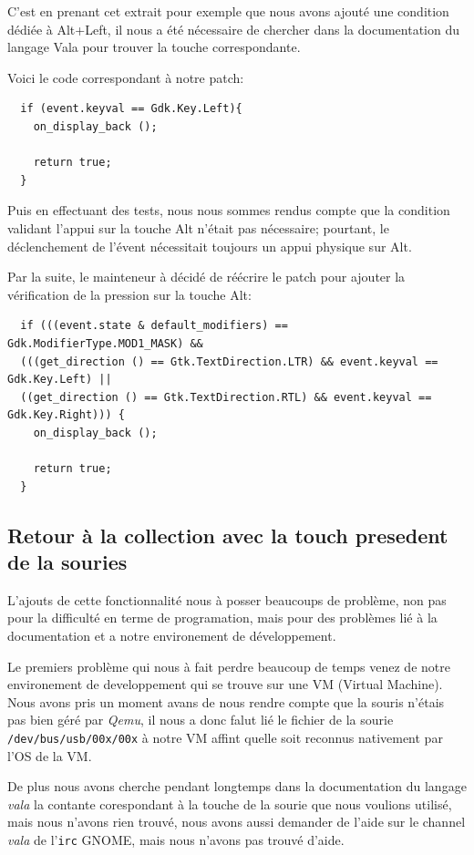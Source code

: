 \documentclass[12pt]{report}
\begin{document}
C'est en prenant cet extrait pour exemple que nous avons ajouté une
condition dédiée à Alt+Left, il nous a été nécessaire de chercher dans
la documentation du langage Vala pour trouver la touche
correspondante.

Voici le code correspondant à notre patch:

\begin{verbatim}
  if (event.keyval == Gdk.Key.Left){			
    on_display_back ();
    
    return true;
  }
\end{verbatim}

Puis en effectuant des tests, nous nous sommes rendus compte que la
condition validant l'appui sur la touche Alt n'était pas nécessaire;
pourtant, le déclenchement de l'évent nécessitait toujours un appui
physique sur Alt.

Par la suite, le mainteneur à décidé de réécrire le patch pour ajouter
la vérification de la pression sur la touche Alt:

\begin{verbatim}
  if (((event.state & default_modifiers) == Gdk.ModifierType.MOD1_MASK) &&
  (((get_direction () == Gtk.TextDirection.LTR) && event.keyval == Gdk.Key.Left) ||
  ((get_direction () == Gtk.TextDirection.RTL) && event.keyval == Gdk.Key.Right))) {
    on_display_back ();

    return true;
  }
\end{verbatim}

\subsection{Retour à la collection avec la touch presedent de la souries}
L'ajouts de cette fonctionnalité nous à posser beaucoups de problème, non pas
pour la difficulté en terme de programation, mais pour des problèmes lié à la
documentation et a notre environement de développement.

Le premiers problème qui nous à fait perdre beaucoup de temps venez de notre
environement de developpement qui se trouve sur une VM (Virtual Machine).
Nous avons pris un moment avans de nous rendre compte que la souris n'étais
pas bien géré par \textit{Qemu}, il nous a donc falut lié le fichier de
la sourie \texttt{/dev/bus/usb/00x/00x} à notre VM affint quelle soit reconnus
nativement par l'OS de la VM.

De plus nous avons cherche pendant longtemps dans la documentation du langage
\textit{vala} la contante corespondant à la touche de la sourie que nous
voulions utilisé, mais nous n'avons rien trouvé, nous avons aussi demander
de l'aide sur le channel \textit{vala} de l'\texttt{irc} GNOME, mais nous
n'avons pas trouvé d'aide.
\end{document}
